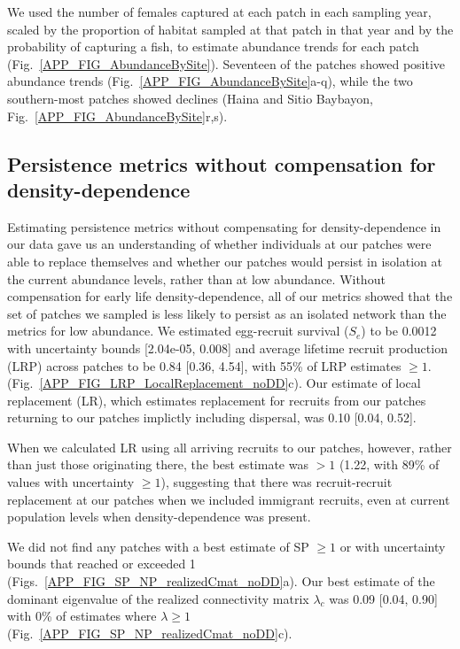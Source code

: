 \documentclass[12pt, oneside]{article}   	%
\begin{document}
We used the number of females captured at each patch in each sampling year, scaled by the proportion of habitat sampled at that patch in that year and by the probability of capturing a fish, to estimate abundance trends for each patch (Fig.\ \ref{APP_FIG_AbundanceBySite}). Seventeen of the patches showed positive abundance trends (Fig.\ \ref{APP_FIG_AbundanceBySite}a-q), while the two southern-most patches showed declines (Haina and Sitio Baybayon, Fig.\ \ref{APP_FIG_AbundanceBySite}r,s).

\subsection{Persistence metrics without compensation for density-dependence} \label{APP_SEC_RESULTS_noDD} %
Estimating persistence metrics without compensating for density-dependence in our data gave us an understanding of whether individuals at our patches were able to replace themselves and whether our patches would persist in isolation at the current abundance levels, rather than at low abundance. Without compensation for early life density-dependence, all of our metrics showed that the set of patches we sampled is less likely to persist as an isolated network than the metrics for low abundance. We estimated egg-recruit survival ($S_e$) to be 0.0012 with uncertainty bounds [2.04e-05, 0.008] and average lifetime recruit production ($\text{LRP}$) across patches to be 0.84 [0.36, 4.54], with 55\% of LRP estimates $\geq 1$. (Fig.\ \ref{APP_FIG_LRP_LocalReplacement_noDD}c). Our estimate of local replacement (LR), which estimates replacement for recruits from our patches returning to our patches implictly including dispersal, was 0.10 [0.04, 0.52]. 

When we calculated LR using all arriving recruits to our patches, however, rather than just those originating there, the best estimate was $> 1$ (1.22, with 89\% of values with uncertainty $\geq 1$), suggesting that there was recruit-recruit replacement at our patches when we included immigrant recruits, even at current population levels when density-dependence was present.

We did not find any patches with a best estimate of SP $\geq 1$ or with uncertainty bounds that reached or exceeded 1 (Figs.\ \ref{APP_FIG_SP_NP_realizedCmat_noDD}a). Our best estimate of the dominant eigenvalue of the realized connectivity matrix $\lambda_c$ was 0.09 [0.04, 0.90] with 0\% of estimates where $\lambda \geq 1$ (Fig.\ \ref{APP_FIG_SP_NP_realizedCmat_noDD}c). 
\end{document}
